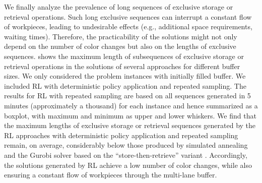 \documentclass[11pt]{elsarticle}
\begin{document}
We finally analyze the prevalence of long sequences of exclusive storage or retrieval operations. Such long exclusive sequences can interrupt a constant flow of workpieces, leading to undesirable effects (e.g., additional space requirements, waiting times). Therefore, the practicability of the solutions might not only depend on the number of color changes but also on the lengths of exclusive sequences.  shows the maximum length of subsequences of exclusive storage or retrieval operations in the solutions of several approaches for different buffer sizes. We only considered the problem instances with initially filled buffer. We included RL with deterministic policy application and repeated sampling. The results for RL with repeated sampling are based on all sequences generated in 5 minutes (approximately a thousand) for each instance and hence summarized as a boxplot, with maximum and minimum as upper and lower whiskers. We find that the maximum lengths of exclusive storage or retrieval sequences generated by the RL approaches with deterministic policy application and repeated sampling remain, on average, considerably below those produced by simulated annealing and the Gurobi solver based on the ``store-then-retrieve'' variant \citep{wu2021mathematical}. Accordingly, the solutions generated by RL achieve a low number of color changes, while also ensuring a constant flow of workpieces through the multi-lane buffer.
\end{document}
